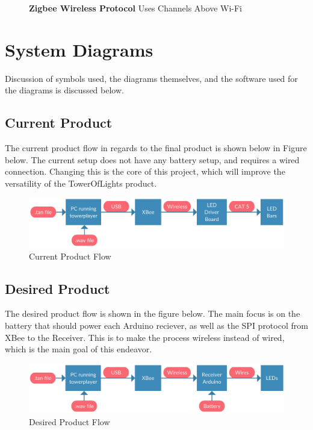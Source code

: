 \documentclass[12pt]{article}
\begin{document}
{{{{{\begin{itemize}
\begin{figure}[!htb]
					\caption{ \textbf{Zigbee Wireless Protocol} Uses Channels Above Wi-Fi \label{overflow}}
				\end{figure}
		\end{itemize}
		\clearpage	

\section{System Diagrams}
	Discussion of symbols used, the diagrams themselves, and the software used for the diagrams is discussed below.
	
	\subsection{Current Product}
	The current product flow in regards to the final product is shown below in Figure below. The current setup does not have any battery setup, and requires a wired connection. Changing this is the core of this project, which will improve the versatility of the TowerOfLights product.
	
		\begin{figure}[ht!]
			\centering
			\includegraphics[width=170mm]{assets/What_We_Have.png}
			\caption{Current Product Flow \label{overflow}}
		\end{figure}
	
	
	\subsection{Desired Product}
	The desired product flow is shown in the figure below. The main focus is on the battery that should power each Arduino reciever, as well as the SPI protocol from XBee to the Receiver. This is to make the process wireless instead of wired, which is the main goal of this endeavor.
	
	\begin{figure}[ht!]
		\centering
		\includegraphics[width=170mm]{assets/What_We_Want.png}
		\caption{Desired Product Flow \label{overflow}}
	\end{figure}


}}}}}
\end{document}
